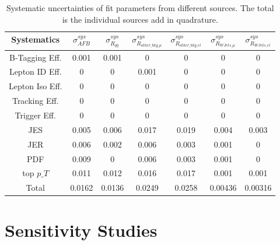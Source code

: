 \documentclass{cmspaperpdf}
\begin{document}
\begin{table}[htb]
\centering
\begin{tabular}{c|cc|cccc}
Systematics &    $\sigma_{AFB}^{sys}$ & $\sigma_{R_{q\bar{q}}}^{sys}$ & $\sigma_{R_{other\_bkg\_\mu}}^{sys}$ & $\sigma_{R_{other\_bkg\_el}}^{sys}$ & $\sigma_{R_{WJets\_\mu}}^{sys}$ & $\sigma_{R_{WJets\_el}}^{sys}$  \\
\hline
B-Tagging Eff.  &   0.001 &    0.001 &                  0 &                  0 &              0 &              0 \\
Lepton ID Eff.  &       0 &        0 &              0.001 &                  0 &              0 &              0 \\
Lepton Iso Eff. &       0 &        0 &                  0 &                  0 &              0 &              0 \\
Tracking Eff.   &       0 &        0 &                  0 &                  0 &              0 &              0 \\
Trigger Eff.    &       0 &        0 &                  0 &                  0 &              0 &              0 \\
JES             &   0.005 &    0.006 &              0.017 &              0.019 &          0.004 &          0.003 \\
JER             &   0.006 &    0.002 &              0.006 &              0.003 &          0.001 &              0 \\
PDF             &   0.009 &        0 &              0.006 &              0.003 &          0.001 &              0 \\
top $p\_T$      &   0.011 &    0.012 &              0.016 &              0.017 &          0.001 &          0.001 \\
\hline
Total           &  0.0162 &   0.0136 &             0.0249 &             0.0258 &        0.00436 &        0.00316 \\
\hline
\end{tabular}
\caption{Systematic uncertainties of fit parameters from different sources. The total is the individual sources add in quadrature. }
\label{tab:sys-err}
\end{table}


\clearpage

\section{Sensitivity Studies}
\end{document}
